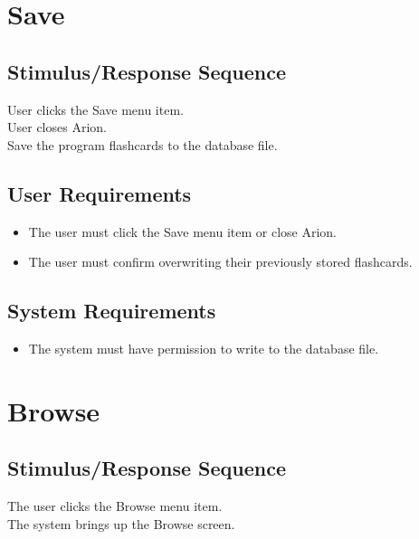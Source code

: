 \documentclass{scrreprt}
\begin{document}
\section{Save}
    \subsection*{Stimulus/Response Sequence}
        \begin{flushleft}
             User clicks the Save menu item. \\
             User closes Arion. \\
             Save the program flashcards to the database file.
        \end{flushleft}

    \subsection*{User Requirements}
        \begin{itemize}
            \item The user must click the Save menu item or close Arion.
            \item The user must confirm overwriting their previously stored flashcards.
        \end{itemize}

    \subsection*{System Requirements}
        \begin{itemize}
            \item The system must have permission to write to the database file.
        \end{itemize}

\section{Browse}
    \subsection*{Stimulus/Response Sequence}
        \begin{flushleft}
             The user clicks the Browse menu item. \\
             The system brings up the Browse screen. \\
        \end{flushleft}
\end{document}
